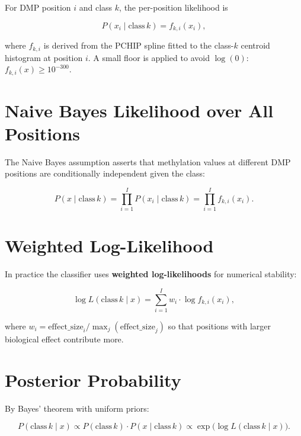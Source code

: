 \documentclass[11pt]{article}
\begin{document}
For DMP position \(i\) and class \(k\), the per-position likelihood is

\begin{equation}
  P(x_i \mid \text{class}\,k) = f_{k,i}(x_i),
  \label{eq:perpos_likelihood}
\end{equation}

where \(f_{k,i}\) is derived from the PCHIP spline fitted to the class-$k$
centroid histogram at position $i$.  A small floor is applied to avoid
\(\log(0)\): \(f_{k,i}(x) \geq 10^{-300}\).

\section{Naive Bayes Likelihood over All Positions}

The Naive Bayes assumption asserts that methylation values at different DMP
positions are conditionally independent given the class:

\begin{equation}
  P(x \mid \text{class}\,k)
  = \prod_{i=1}^{I} P(x_i \mid \text{class}\,k)
  = \prod_{i=1}^{I} f_{k,i}(x_i).
\end{equation}

\section{Weighted Log-Likelihood}

In practice the classifier uses \textbf{weighted log-likelihoods} for
numerical stability:

\begin{equation}
  \log L(\text{class}\,k \mid x)
  = \sum_{i=1}^{I} w_i \cdot \log f_{k,i}(x_i),
  \label{eq:loglik}
\end{equation}

where \(w_i = \mathrm{effect\_size}_i / \max_j(\mathrm{effect\_size}_j)\)
so that positions with larger biological effect contribute more.

\section{Posterior Probability}

By Bayes' theorem with uniform priors:

\begin{equation}
  P(\text{class}\,k \mid x)
  \propto P(\text{class}\,k)\cdot P(x \mid \text{class}\,k)
  \propto \exp\!\bigl(\log L(\text{class}\,k \mid x)\bigr).
\end{equation}
\end{document}
